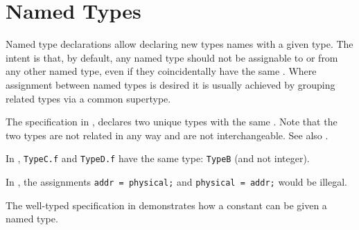 \FormallyParagraph
\begin{mathpar}
\end{mathpar}

\section{Named Types\label{sec:NamedTypes}}
Named type declarations allow declaring new types names with a given type.
The intent is that, by default, any named type should not be assignable to or from any other named type, even
if they coincidentally have the same \structureterm. Where assignment between named types is desired it is usually
achieved by grouping related types via a common supertype.

The specification in , declares two unique types with the same
\structureterm. Note that the two types are not related in
any way and are not interchangeable. See also .

In , \verb|TypeC.f| and \verb|TypeD.f| have the same type: \verb|TypeB| (and not integer).

In , the assignments \verb|addr = physical;|
and \verb|physical = addr;| would be illegal.

The well-typed specification in 
demonstrates how a constant can be given a named type.

